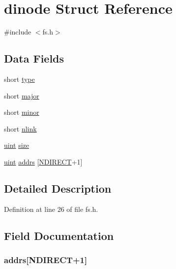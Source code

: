 \hypertarget{structdinode}{\section{dinode Struct Reference}
\label{structdinode}
}


{\ttfamily \#include $<$fs.\-h$>$}

\subsection*{Data Fields}
\begin{DoxyCompactItemize}
\item 
short \hyperlink{structdinode_acd579dfd50a9ea905ca697ed8707bf3b}{type}
\item 
short \hyperlink{structdinode_abe2b53edb36f3d674f052ab7254d4a3e}{major}
\item 
short \hyperlink{structdinode_adb75a8841fbdda3cb4f2373edac4f1dc}{minor}
\item 
short \hyperlink{structdinode_aa7e1ed70907ed9a2fc9c9a7c24cd0d4d}{nlink}
\item 
\hyperlink{types_8h_a91ad9478d81a7aaf2593e8d9c3d06a14}{uint} \hyperlink{structdinode_a22d26304a3b3aca97e6311f6939dd1bf}{size}
\item 
\hyperlink{types_8h_a91ad9478d81a7aaf2593e8d9c3d06a14}{uint} \hyperlink{structdinode_a94905615a8f79fd11b8f500e1bbee16d}{addrs} \mbox{[}\hyperlink{fs_8h_acd38e9532d4b3623f844b93c012a8e06}{N\-D\-I\-R\-E\-C\-T}+1\mbox{]}
\end{DoxyCompactItemize}


\subsection{Detailed Description}


Definition at line 26 of file fs.\-h.



\subsection{Field Documentation}
\hypertarget{structdinode_a94905615a8f79fd11b8f500e1bbee16d}{
\subsubsection[{addrs}]{ addrs\mbox{[}{\bf N\-D\-I\-R\-E\-C\-T}+1\mbox{]}}}\label{structdinode_a94905615a8f79fd11b8f500e1bbee16d}


